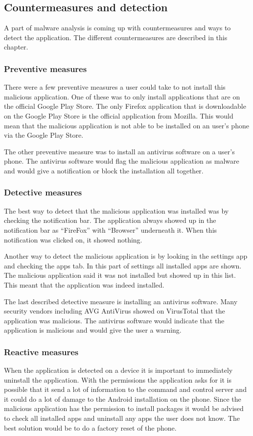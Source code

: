 \subsection{Countermeasures and detection}
A part of malware analysis is coming up with countermeasures and ways to detect the application.
The different countermeasures are described in this chapter.

\subsubsection{Preventive measures}
There were a few preventive measures a user could take to not install this malicious application.
One of these was to only install applications that are on the official Google Play Store.
The only Firefox application that is downloadable on the Google Play Store is the official application from Mozilla.
This would mean that the malicious application is not able to be installed on an user’s phone via the Google Play Store.

The other preventive measure was to install an antivirus software on a user’s phone.
The antivirus software would flag the malicious application as malware and would give a notification or block the installation all together.

\subsubsection{Detective measures}
The best way to detect that the malicious application was installed was by checking the notification bar.
The application always showed up in the notification bar as “FireFox” with “Browser” underneath it.
When this notification was clicked on, it showed nothing.

Another way to detect the malicious application is by looking in the settings app and checking the apps tab.
In this part of settings all installed apps are shown.
The malicious application said it was not installed but showed up in this list.
This meant that the application was indeed installed.

The last described detective measure is installing an antivirus software.
Many security vendors including AVG AntiVirus showed on VirusTotal that the application was malicious.
The antivirus software would indicate that the application is malicious and would give the user a warning.

\subsubsection{Reactive measures}
When the application is detected on a device it is important to immediately uninstall the application.
With the permissions the application asks for it is possible that it send a lot of information to the command and control server and it could do a lot of damage to the Android installation on the phone.
Since the malicious application has the permission to install packages it would be advised to check all installed apps and uninstall any apps the user does not know.
The best solution would be to do a factory reset of the phone.

